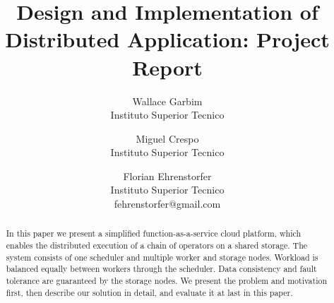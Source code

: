 \documentclass[times, 10pt,twocolumn]{article}
\begin{document}
\title{Design and Implementation of Distributed Application: Project Report}

\author{
Wallace Garbim\\Instituto Superior Tecnico\\
\and
Miguel Crespo\\Instituto Superior Tecnico\\
\and
Florian Ehrenstorfer\\
Instituto Superior Tecnico\\fehrenstorfer@gmail.com\\
}

\maketitle
\thispagestyle{empty}

\begin{abstract}
In this paper we present a simplified function-as-a-service cloud platform, which enables the distributed execution of a chain of operators on a shared storage. 
The system consists of one scheduler and multiple worker and storage nodes.
Workload is balanced equally between workers through the scheduler.
Data consistency and fault tolerance are guaranteed by the storage nodes.
We present the problem and motivation first, then describe our solution in detail, and evaluate it at last in this paper.
\end{abstract}










\nocite{ex1,ex2}


\end{document}
